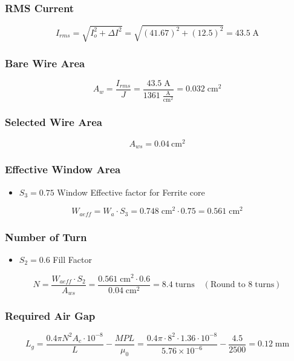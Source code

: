 \subsubsection*{RMS Current}
\begin{equation}
I_{rms} = \sqrt{I_o^2 + \Delta I^2} 
        = \sqrt{(41.67)^2 + (12.5)^2} 
        = \boxed{43.5\;\text{A}}
\end{equation}

\subsubsection*{Bare Wire Area}
\begin{equation}
A_w = \frac{I_{rms}}{J} 
    = \frac{43.5\;\text{A}}{1361\;\frac{\text{A}}{\text{cm}^2}} 
    = \boxed{0.032\;\text{cm}^2}
\end{equation}
\subsubsection*{Selected Wire Area}
\[
A_{ws} = 0.04\ \text{cm}^2
\]
\subsubsection*{Effective Window Area}
\begin{itemize}
    \item $S_3 = 0.75$ Window Effective factor for Ferrite core
\end{itemize}
\begin{equation}
W_{aeff} = W_a \cdot S_3 
         = 0.748\;\text{cm}^2 \cdot 0.75 
         = \boxed{0.561\;\text{cm}^2}
\end{equation}
\subsubsection*{Number of Turn}
\begin{itemize}
    \item $S_2 = 0.6$ Fill Factor 
\end{itemize}
\begin{equation}
N = \frac{W_{aeff} \cdot S_2}{A_{ws}} 
  = \frac{0.561\;\text{cm}^2 \cdot 0.6}{0.04\;\text{cm}^2}
  = \boxed{8.4\;\text{turns}} \quad (\text{Round to } 8\;\text{turns})
\end{equation}

\subsubsection*{Required Air Gap}
\begin{equation}
L_g = \frac{0.4 \pi N^2 A_c \cdot 10^{-8}}{L} - \frac{MPL}{\mu_0} 
    = \frac{0.4 \pi \cdot 8^2 \cdot 1.36 \cdot 10^{-8}}{5.76 \times 10^{-6}} - \frac{4.5}{2500}
    = \boxed{0.12\;\text{mm}}
\end{equation}



